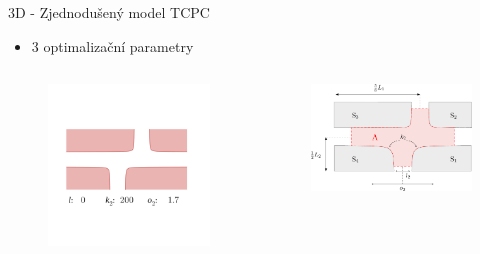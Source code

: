 \documentclass[aspectratio=169,xcolor=dvipsnames]{beamer}
\begin{document}
\begin{frame}{3D - Zjednodušený model TCPC}
	\addtocounter{framenumber}{-1}
	\begin{itemize}
		\item 3 optimalizační parametry
	\end{itemize}
	\begin{columns}
		\begin{column}{.58\textwidth}
			\begin{figure}
				\includegraphics[width=1.\linewidth, trim={5cm 6cm 8cm 19cm}, clip]{Images/b.png}		
			\end{figure}
		\end{column}
		\begin{column}{.42\textwidth}
			\vspace{-15mm}
			\begin{figure}
				\includegraphics[width=1.\linewidth, trim={0 0 0 0}, clip]{Images/krizovatka.pdf}		

\end{figure}
\end{column}
\end{columns}
\end{frame}
\end{document}
